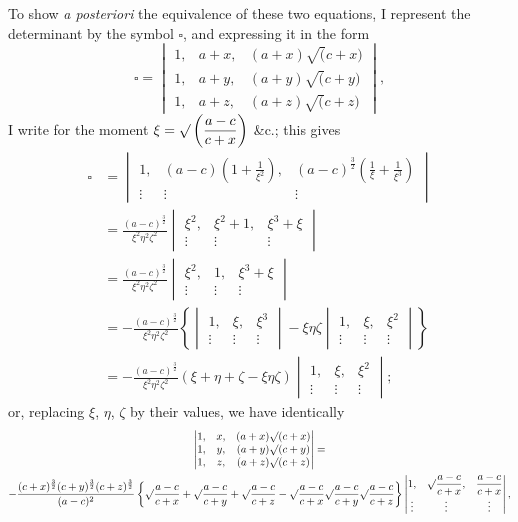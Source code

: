 \documentclass[11pt,a4paper]{book}
\begin{document}
To show \textit{a posteriori} the equivalence of these two equations, I represent the determinant by the symbol $\square$, and expressing it in the form
\[
\square =
\begin{vmatrix}
1, & a+x, & (a+x)\surd(c+x) \\
1, & a+y, & (a+y)\surd(c+y) \\
1, & a+z, & (a+z)\surd(c+z)
\end{vmatrix},
\]
I write for the moment $\xi = \surd\left(\dfrac{a-c}{c+x}\right)$ \&c.; this gives
\begin{align*}
\square &=
\begin{vmatrix}
1, & (a-c)\left(1+\frac{1}{\xi^2}\right), & (a-c)^{\frac{3}{2}}\left(\frac{1}{\xi}+\frac{1}{\xi^3}\right) \\
\vdots & \vdots & \vdots
\end{vmatrix}\\
&= \frac{(a-c)^{\frac{3}{2}}}{\xi^2\eta^2\zeta^2}
\begin{vmatrix}
\xi^2, & \xi^2+1, & \xi^3+\xi \\
\vdots & \vdots & \vdots
\end{vmatrix}\\
&= \frac{(a-c)^{\frac{3}{2}}}{\xi^2\eta^2\zeta^2}
\begin{vmatrix}
\xi^2, & 1, & \xi^3+\xi \\
\vdots & \vdots & \vdots
\end{vmatrix}\\
&= -\frac{(a-c)^{\frac{3}{2}}}{\xi^2\eta^2\zeta^2}
\left\{
\begin{vmatrix}
1, & \xi, & \xi^3 \\
\vdots & \vdots & \vdots
\end{vmatrix}
- \xi\eta\zeta
\begin{vmatrix}
1, & \xi, & \xi^2 \\
\vdots & \vdots & \vdots
\end{vmatrix}
\right\}\\
&= -\frac{(a-c)^{\frac{3}{2}}}{\xi^2\eta^2\zeta^2}(\xi+\eta+\zeta-\xi\eta\zeta)
\begin{vmatrix}
1, & \xi, & \xi^2 \\
\vdots & \vdots & \vdots
\end{vmatrix};
\end{align*}
or, replacing $\xi$, $\eta$, $\zeta$ by their values, we have identically
\begin{multline*}
\begin{vmatrix}
1, & x, & (a+x)\surd(c+x) \\
1, & y, & (a+y)\surd(c+y) \\
1, & z, & (a+z)\surd(c+z)
\end{vmatrix} = \\
- \frac{(c+x)^{\frac{3}{2}}(c+y)^{\frac{3}{2}}(c+z)^{\frac{3}{2}}}{(a-c)^2}
\left\{
\surd\frac{a-c}{c+x} + \surd\frac{a-c}{c+y} + \surd\frac{a-c}{c+z}
- \surd\frac{a-c}{c+x}\surd\frac{a-c}{c+y}\surd\frac{a-c}{c+z}
\right\}
\begin{vmatrix}
1, & \surd\dfrac{a-c}{c+x}, & \dfrac{a-c}{c+x} \\
\vdots & \vdots & \vdots
\end{vmatrix},
\end{multline*}
\end{document}
